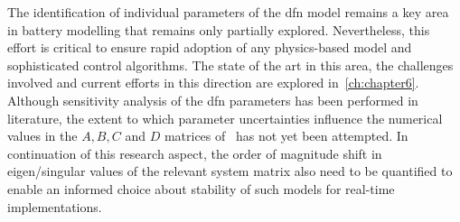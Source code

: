 

 The  identification of  individual parameters  of the  \gls{dfn}
model  remains a  key  area in  battery modelling  that  remains only  partially
explored. Nevertheless, this effort is critical  to ensure rapid adoption of any
physics-based model and  sophisticated control algorithms. The state  of the art
in this area, the challenges involved  and current efforts in this direction are
explored in~\cref{ch:chapter6}.  Although sensitivity analysis of  the \gls{dfn}
parameters has been performed in  literature,  the extent to
which  parameter uncertainties  influence the  numerical  values in  the $A,  B,
C$  and  $D$  matrices  of~ has  not  yet  been  attempted.
In  continuation of  this  research  aspect, the  order  of  magnitude shift  in
eigen/singular values of  the relevant system matrix also need  to be quantified
to  enable an  informed  choice about  stability of  such  models for  real-time
implementations.










